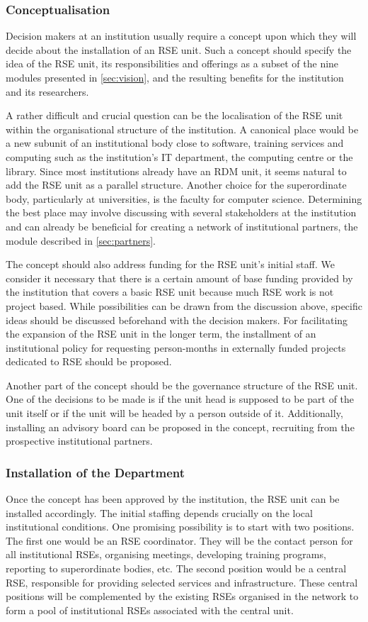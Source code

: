 \documentclass[a4paper]{article}
\begin{document}
\subsubsection{Conceptualisation}
Decision makers at an institution usually require a concept upon which they will decide about the installation of an RSE unit.
Such a concept should specify the idea of the RSE unit, its responsibilities and offerings as a subset of the nine modules presented in \autoref{sec:vision}, and the resulting benefits for the institution and its researchers.

A rather difficult and crucial question can be the localisation of the RSE unit within the organisational structure of the institution.
A canonical place would be a new subunit of an institutional body close to software,
training services and computing such as the institution's IT department, the computing centre or the library.
Since most institutions already have an RDM unit, it seems natural to add the RSE unit as a parallel structure.
Another choice for the superordinate body, particularly at universities, is the faculty for computer science.
Determining the best place may involve discussing with several stakeholders at the institution and can already be beneficial for creating a
network of institutional partners, the module described in \autoref{sec:partners}.

The concept should also address funding for the RSE unit's initial staff.
We consider it necessary that there is a certain amount of base funding provided by the institution that covers a basic RSE unit because much RSE work is not project based.
While possibilities can be drawn from the discussion above, specific ideas should be discussed beforehand with the decision makers.
For facilitating the expansion of the RSE unit in the longer term, the installment of an institutional policy for requesting person-months in externally funded projects dedicated to RSE should be proposed.

Another part of the concept should be the governance structure of the RSE unit.
One of the decisions to be made is if the unit head is supposed to be part of the unit itself or if the unit will be headed by a person outside of it.
Additionally, installing an advisory board can be proposed in the concept, recruiting from the prospective institutional partners.

\subsubsection{Installation of the Department}
Once the concept has been approved by the institution, the RSE unit can be installed accordingly.
The initial staffing depends crucially on the local institutional conditions.
One promising possibility is to start with two positions.
The first one would be an RSE coordinator.
They will be the contact person for all institutional RSEs, organising meetings, developing training programs, reporting to superordinate bodies, etc.
The second position would be a central RSE, responsible for providing selected services and infrastructure.
These central positions will be complemented by the existing RSEs organised in the network to form a pool of institutional RSEs associated with the central unit.
\end{document}
